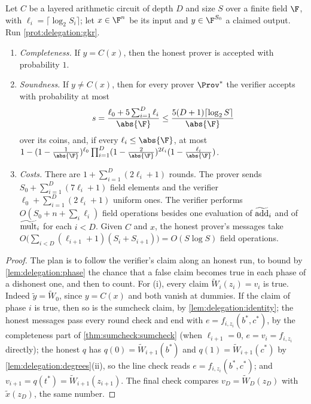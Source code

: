 \begin{refsection}
\begin{theorem}\label{thm:delegation:gkr}
Let $C$ be a layered arithmetic circuit of depth $D$ and size $S$ over a finite field $\F$, with $\ell_i=\lceil\log_2S_i\rceil$; let $x\in\F^n$ be its input and $y\in\F^{S_0}$ a claimed output. Run \cref{prot:delegation:gkr}.
\begin{enumerate}
\item \emph{Completeness.} If $y=C(x)$, then the honest prover is accepted with probability $1$.
\item \emph{Soundness.} If $y\ne C(x)$, then for every prover $\Prov^*$ the verifier accepts with probability at most
\begin{equation}\label{eq:delegation:sound}
s=\frac{\ell_0+5\sum_{i=1}^D\ell_i}{\abs{\F}}\le\frac{5(D+1)\lceil\log_2S\rceil}{\abs{\F}}
\end{equation}
over its coins, and, if every $\ell_i\le\abs{\F}$, at most $1-(1-\frac1{\abs{\F}})^{\ell_0}\prod_{i=1}^D(1-\frac2{\abs{\F}})^{2\ell_i}(1-\frac{\ell_i}{\abs{\F}})$.
\item \emph{Costs.} There are $1+\sum_{i=1}^D(2\ell_i+1)$ rounds. The prover sends $S_0+\sum_{i=1}^D(7\ell_i+1)$ field elements and the verifier $\ell_0+\sum_{i=1}^D(2\ell_i+1)$ uniform ones. The verifier performs $O(S_0+n+\sum_i\ell_i)$ field operations besides one evaluation of $\widetilde{\mathrm{add}}_i$ and of $\widetilde{\mathrm{mult}}_i$ for each $i<D$. Given $C$ and $x$, the honest prover's messages take $O\bigl(\sum_{i<D}(\ell_{i+1}+1)(S_i+S_{i+1})\bigr)=O(S\log S)$ field operations.
\end{enumerate}
\end{theorem}

\begin{proof}
The plan is to follow the verifier's claim along an honest run, to bound by \cref{lem:delegation:phase} the chance that a false claim becomes true in each phase of a dishonest one, and then to count. For (i), every claim $\tilde W_i(z_i)=v_i$ is true. Indeed $\tilde y=\tilde W_0$, since $y=C(x)$ and both vanish at dummies. If the claim of phase $i$ is true, then so is the sumcheck claim, by \cref{lem:delegation:identity}; the honest messages pass every round check and end with $e=f_{i,z_i}(b^*,c^*)$, by the completeness part of \cref{thm:sumcheck:sumcheck} (when $\ell_{i+1}=0$, $e=v_i=f_{i,z_i}$ directly); the honest $q$ has $q(0)=\tilde W_{i+1}(b^*)$ and $q(1)=\tilde W_{i+1}(c^*)$ by \cref{lem:delegation:degrees}(ii), so the line check reads $e=f_{i,z_i}(b^*,c^*)$; and $v_{i+1}=q(t^*)=\tilde W_{i+1}(z_{i+1})$. The final check compares $v_D=\tilde W_D(z_D)$ with $\tilde x(z_D)$, the same number.


\end{proof}
\end{refsection}
